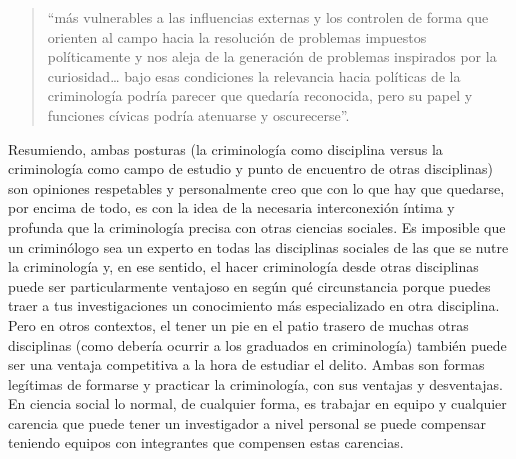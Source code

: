 \documentclass[
  spanish,
  letterpaper,
  DIV=11,
  numbers=noendperiod]{scrreprt}
\begin{document}
\begin{quote}
``más vulnerables a las influencias externas y los controlen de forma
que orienten al campo hacia la resolución de problemas impuestos
políticamente y nos aleja de la generación de problemas inspirados por
la curiosidad\ldots{} bajo esas condiciones la relevancia hacia
políticas de la criminología podría parecer que quedaría reconocida,
pero su papel y funciones cívicas podría atenuarse y oscurecerse''.
\end{quote}

Resumiendo, ambas posturas (la criminología como disciplina versus la
criminología como campo de estudio y punto de encuentro de otras
disciplinas) son opiniones respetables y personalmente creo que con lo
que hay que quedarse, por encima de todo, es con la idea de la necesaria
interconexión íntima y profunda que la criminología precisa con otras
ciencias sociales. Es imposible que un criminólogo sea un experto en
todas las disciplinas sociales de las que se nutre la criminología y, en
ese sentido, el hacer criminología desde otras disciplinas puede ser
particularmente ventajoso en según qué circunstancia porque puedes traer
a tus investigaciones un conocimiento más especializado en otra
disciplina. Pero en otros contextos, el tener un pie en el patio trasero
de muchas otras disciplinas (como debería ocurrir a los graduados en
criminología) también puede ser una ventaja competitiva a la hora de
estudiar el delito. Ambas son formas legítimas de formarse y practicar
la criminología, con sus ventajas y desventajas. En ciencia social lo
normal, de cualquier forma, es trabajar en equipo y cualquier carencia
que puede tener un investigador a nivel personal se puede compensar
teniendo equipos con integrantes que compensen estas carencias.
\end{document}
